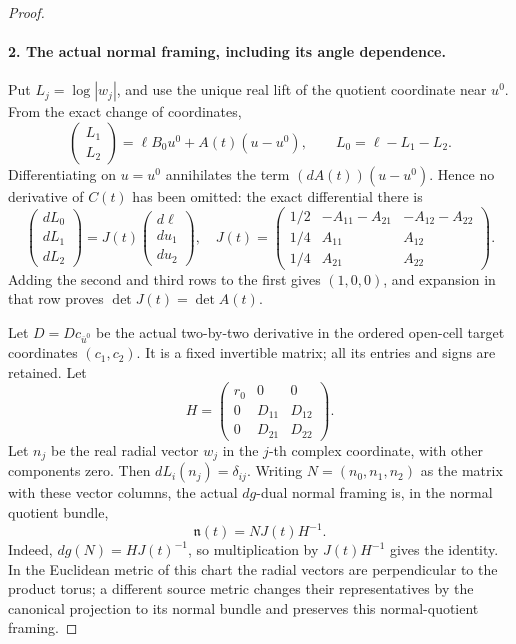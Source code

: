 \begin{proof}
\paragraph{2. The actual normal framing, including its angle dependence.}
Put \(L_j=\log|w_j|\), and use the unique real lift of the quotient
coordinate near \(u^0\). From the exact change of coordinates,
\begin{equation}
 \begin{pmatrix}L_1\\L_2\end{pmatrix}
 =\ell B_0u^0+A(t)(u-u^0),\qquad
 L_0=\ell-L_1-L_2.
 \label{cusp-null:eq:nearby-moduli}
\end{equation}
Differentiating on \(u=u^0\) annihilates the term
\((dA(t))(u-u^0)\). Hence no derivative of \(C(t)\) has been omitted:
the exact differential there is
\begin{equation}
 \begin{pmatrix}dL_0\\dL_1\\dL_2\end{pmatrix}
 =J(t)\begin{pmatrix}d\ell\\du_1\\du_2\end{pmatrix},\quad
 J(t)=
 \begin{pmatrix}
 1/2&-A_{11}-A_{21}&-A_{12}-A_{22}\\
 1/4&A_{11}&A_{12}\\
 1/4&A_{21}&A_{22}
 \end{pmatrix}.
 \label{cusp-null:eq:J}
\end{equation}
Adding the second and third rows to the first gives \((1,0,0)\),
and expansion in that row proves \(\det J(t)=\det A(t)\).

Let \(D=Dc_{\overline u^0}\) be the actual two-by-two derivative in
the ordered open-cell target coordinates \((c_1,c_2)\). It is a fixed
invertible matrix; all its entries and signs are retained. Let
\[
 H=\begin{pmatrix}r_0&0&0\\0&D_{11}&D_{12}\\0&D_{21}&D_{22}\end{pmatrix}.
\]
Let \(n_j\) be the real radial vector \(w_j\) in the \(j\)-th complex
coordinate, with other components zero. Then \(dL_i(n_j)=\delta_{ij}\).
Writing \(N=(n_0,n_1,n_2)\) as the matrix with these vector columns, the actual
\(dg\)-dual normal framing is, in the normal quotient bundle,
\begin{equation}
 \mathfrak n(t)=N J(t)H^{-1}.
 \label{cusp-null:eq:actual-frame}
\end{equation}
Indeed, \(dg(N)=HJ(t)^{-1}\), so multiplication by \(J(t)H^{-1}\)
gives the identity. In the Euclidean metric of this chart the radial
vectors are perpendicular to the product torus; a different source
metric changes their representatives by the canonical projection to its
normal bundle and preserves this normal-quotient framing.


\end{proof}

